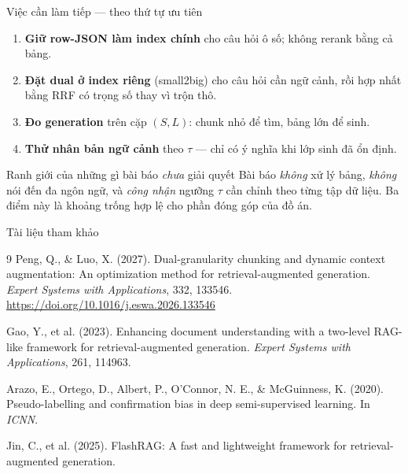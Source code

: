 \documentclass[aspectratio=169,10pt]{beamer}
\begin{document}
\begin{frame}{Việc cần làm tiếp --- theo thứ tự ưu tiên}
  \begin{enumerate}
    \item \textbf{Giữ row-JSON làm index chính} cho câu hỏi ô số; không rerank
          bằng cả bảng.
    \item \textbf{Đặt dual ở index riêng} (small2big) cho câu hỏi cần ngữ cảnh,
          rồi hợp nhất bằng RRF có trọng số thay vì trộn thô.
    \item \textbf{Đo generation} trên cặp $(S,L)$: chunk nhỏ để tìm, bảng lớn để sinh.
    \item \textbf{Thử nhân bản ngữ cảnh} theo $\tau$ --- chỉ có ý nghĩa khi lớp
          sinh đã ổn định.
  \end{enumerate}
  \vspace{0.4em}
  \begin{alertblock}{\small Ranh giới của những gì bài báo \emph{chưa} giải quyết}
    \small Bài báo \emph{không} xử lý bảng, \emph{không} nói đến đa ngôn ngữ, và
    \emph{công nhận} ngưỡng $\tau$ cần chỉnh theo từng tập dữ liệu. Ba điểm này là
    khoảng trống hợp lệ cho phần đóng góp của đồ án.
  \end{alertblock}
\end{frame}

\begin{frame}[fragile]{Tài liệu tham khảo}
  \footnotesize
  \begin{thebibliography}{9}
    Peng, Q., \& Luo, X. (2027).
    \newblock Dual-granularity chunking and dynamic context augmentation: An optimization method for retrieval-augmented generation.
    \newblock \emph{Expert Systems with Applications}, 332, 133546.
    \newblock \url{https://doi.org/10.1016/j.eswa.2026.133546}

    Gao, Y., et al. (2023).
    \newblock Enhancing document understanding with a two-level RAG-like framework for retrieval-augmented generation.
    \newblock \emph{Expert Systems with Applications}, 261, 114963.

    Arazo, E., Ortego, D., Albert, P., O'Connor, N. E., \& McGuinness, K. (2020).
    \newblock Pseudo-labelling and confirmation bias in deep semi-supervised learning.
    \newblock In \emph{ICNN}.

    Jin, C., et al. (2025).
    \newblock FlashRAG: A fast and lightweight framework for retrieval-augmented generation.
  \end{thebibliography}
\end{frame}
\end{document}
